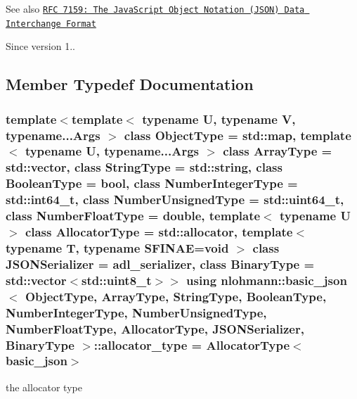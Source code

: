 \begin{DoxySeeAlso}{See also}
\href{http://rfc7159.net/rfc7159}{\tt R\+FC 7159\+: The Java\+Script Object Notation (J\+S\+ON) Data Interchange Format}
\end{DoxySeeAlso}
\begin{DoxySince}{Since}
version 1.. 
\end{DoxySince}


\subsection{Member Typedef Documentation}
\subsubsection[{\texorpdfstring{allocator\+\_\+type}{allocator_type}}]{\setlength{\rightskip}{0pt plus 5cm}template$<$template$<$ typename U, typename V, typename...\+Args $>$ class Object\+Type = std\+::map, template$<$ typename U, typename...\+Args $>$ class Array\+Type = std\+::vector, class String\+Type  = std\+::string, class Boolean\+Type  = bool, class Number\+Integer\+Type  = std\+::int64\+\_\+t, class Number\+Unsigned\+Type  = std\+::uint64\+\_\+t, class Number\+Float\+Type  = double, template$<$ typename U $>$ class Allocator\+Type = std\+::allocator, template$<$ typename T, typename S\+F\+I\+N\+A\+E=void $>$ class J\+S\+O\+N\+Serializer = adl\+\_\+serializer, class Binary\+Type  = std\+::vector$<$std\+::uint8\+\_\+t$>$$>$ using {\bf nlohmann\+::basic\+\_\+json}$<$ Object\+Type, Array\+Type, String\+Type, Boolean\+Type, Number\+Integer\+Type, Number\+Unsigned\+Type, Number\+Float\+Type, Allocator\+Type, J\+S\+O\+N\+Serializer, Binary\+Type $>$\+::{\bf allocator\+\_\+type} =  Allocator\+Type$<${\bf basic\+\_\+json}$>$}\hypertarget{classnlohmann_1_1basic__json_ad38ae80f1e99d4b1f33c99fea4611457}{}\label{classnlohmann_1_1basic__json_ad38ae80f1e99d4b1f33c99fea4611457}


the allocator type 

